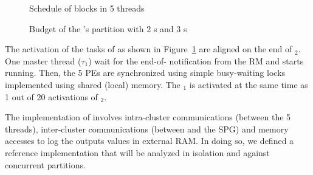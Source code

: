 \documentclass[main.tex]{subfiles}
\begin{document}
\begin{description}
            \begin{figure}
                \centering
                
                \caption{Schedule of \rosace blocks in 5 threads}
                \label{fig_implemExecModel_schedulRosace}
            \end{figure}


            \begin{figure}
                \centering
                \scalebox{0.7}{}
                \caption{Budget of the \rosace's partition with 2 \PN{}s and 3 \PC{}s}
                \label{fig_implemExecModel_rosacePartBudget}
            \end{figure}
            
            The activation of the tasks of \rosace as shown in
            Figure~\ref{fig_implemExecModel_schedulRosace} are aligned on the
            end of \PC{}$_2$. One master thread ($\tau_1$) wait for the
            end-of-\PC{} notification from the RM and starts running. Then, the
            5 PEs are synchronized using simple busy-waiting locks implemented
            using shared (local) memory. The \PC{}$_1$ is activated at the same
            time as 1 out of 20 activations of \PC{}$_2$.
\end{description}

The implementation of \rosace involves intra-cluster communications (between
the 5 threads), inter-cluster communications (between \rosace and the SPG) and
memory accesses to log the outputs values in external RAM. In doing so, we
defined a reference implementation that will be analyzed in isolation and
against concurrent partitions.
\end{document}

